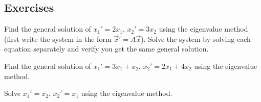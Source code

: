 \subsection{Exercises}

\begin{exercise}
\leavevmode
\begin{tasks}
\task
Find the general solution of $x_1' = 2 x_1$, $x_2' = 3 x_2$ using the
eigenvalue method (first write the system in the form
${\vec{x}}' = A \vec{x}$).
\task
Solve the system by solving each equation
separately and verify you get the same general solution.
\end{tasks}
\end{exercise}

\begin{exercise}
Find the general solution of $x_1' = 3 x_1 + x_2$,
$x_2' = 2 x_1 + 4 x_2$ using the eigenvalue method.
\end{exercise}

\begin{exercise}\ansMark%
Solve $x_1' = x_2$, $x_2' = x_1$ using the eigenvalue method.
\end{exercise}


